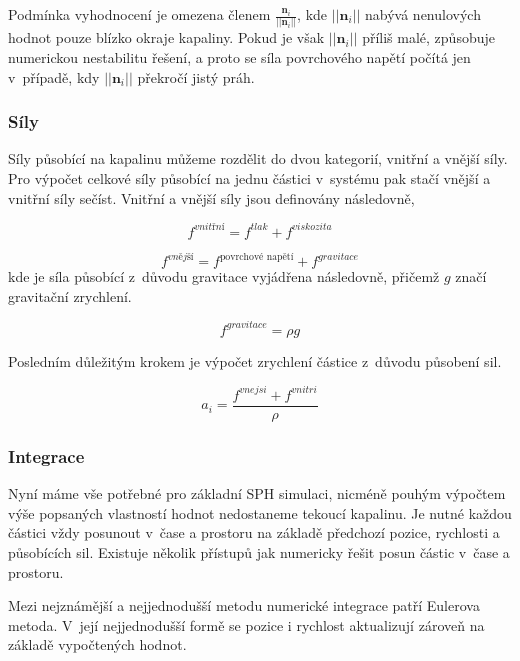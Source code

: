Podmínka vyhodnocení je omezena členem $\frac{\mathbf{n}_i}{||\mathbf{n}_i||}$, kde $||\mathbf{n}_i||$ nabývá nenulových hodnot pouze blízko okraje kapaliny. Pokud je však $||\mathbf{n}_i||$ příliš malé, způsobuje numerickou nestabilitu řešení, a proto se síla povrchového napětí počítá jen v~případě, kdy $||\mathbf{n}_i||$ překročí jistý práh.


\subsubsection{Síly}
Síly působící na kapalinu můžeme rozdělit do dvou kategorií, vnitřní a vnější síly. Pro výpočet celkové síly působící na jednu částici v~systému pak stačí vnější a vnitřní síly sečíst. Vnitřní a vnější síly jsou definovány následovně, \cite{KelagerSPH}

\begin{equation}
    f^{vnitřní} = f^{tlak} + f^{viskozita}
    \label{eq:ForceInt}
\end{equation}

\begin{equation}
    f^{vnější} = f^{\text{povrchové napětí}} + f^{gravitace}
    \label{eq:ForceExt}
\end{equation}
kde je síla působící z~důvodu gravitace vyjádřena následovně, přičemž $g$ značí gravitační zrychlení.

\begin{equation}
    f^{gravitace} = \rho g
\end{equation}

Posledním důležitým krokem je výpočet zrychlení částice z~důvodu působení sil.

\begin{equation}
    a_i = \frac{f^{vnejsi} + f^{vnitri}}{\rho}
    \label{eq:Acc}
\end{equation}

\subsubsection{Integrace}
Nyní máme vše potřebné pro základní SPH simulaci, nicméně pouhým výpočtem výše popsaných vlastností hodnot nedostaneme tekoucí kapalinu. Je nutné každou částici vždy posunout v~čase a prostoru na základě předchozí pozice, rychlosti a působících sil. Existuje několik přístupů jak numericky řešit posun částic v~čase a prostoru.

Mezi nejznámější a nejjednodušší metodu numerické integrace patří Eulerova metoda. V~její nejjednodušší formě se pozice i rychlost aktualizují zároveň na základě vypočtených hodnot.

